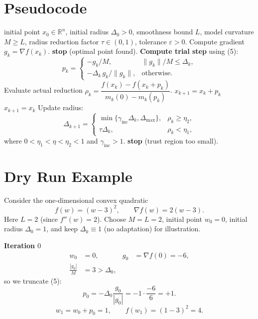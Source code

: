 \documentclass{article}
\begin{document}
\section*{Pseudocode}
\begin{algorithm}[H]
\caption{Trust Region Gradient Descent (TRGD)}
\begin{algorithmic}[1]
\REQUIRE initial point $x_0\in\mathbb{R}^n$, initial radius $\Delta_0>0$, 
smoothness bound $L$, model curvature $M\ge L$, 
radius reduction factor $\tau\in(0,1)$, tolerance $\varepsilon>0$.
    \STATE Compute gradient $g_k=\nabla f(x_k)$.
        \STATE \textbf{stop} (optimal point found).
    \ENDIF
    \STATE \textbf{Compute trial step} using (5):
    \[
    p_k=
    \begin{cases}
        -g_k/M, & \|g_k\|/M\le\Delta_k,\\
        -\Delta_k\,g_k/\|g_k\|, & \text{otherwise.}
    \end{cases}
    \]
    \STATE Evaluate actual reduction $ \rho_k=
    \dfrac{f(x_k)-f(x_k+p_k)}{m_k(0)-m_k(p_k)}$.
        \STATE $x_{k+1}=x_k+p_k$ 
    \ELSE
        \STATE $x_{k+1}=x_k$ 
    \ENDIF
    \STATE Update radius:
    \[
    \Delta_{k+1}=
    \begin{cases}
        \min\{\gamma_{\text{inc}}\Delta_k,\Delta_{\max}\}, & \rho_k\ge \eta_2,\\
        \tau\Delta_k, & \rho_k<\eta_1,
    \end{cases}
    \]
    where $0<\eta_1<\eta<\eta_2<1$ and $\gamma_{\text{inc}}>1$.
        \STATE \textbf{stop} (trust region too small).
    \ENDIF
\ENDFOR
\end{algorithmic}
\end{algorithm}

\section*{Dry Run Example}
Consider the one‑dimensional convex quadratic
\[
f(w)=(w-3)^2,
\qquad \nabla f(w)=2(w-3).
\]
Here $L=2$ (since $f''(w)=2$).  Choose $M=L=2$, initial point $w_0=0$,
initial radius $\Delta_0=1$, and keep $\Delta_k\equiv1$ (no adaptation) for
illustration.

\medskip
\noindent\textbf{Iteration $0$}
\[
\begin{aligned}
w_0 &=0, &
g_0 &=\nabla f(0)= -6,\\
\frac{|g_0|}{M}&=3> \Delta_0,
\end{aligned}
\]
so we truncate (5):
\[
p_0=-\Delta_0\frac{g_0}{|g_0|}= -1\cdot\frac{-6}{6}=+1 .
\]
\[
w_1=w_0+p_0=1,\qquad
f(w_1)=(1-3)^2=4 .
\]
\end{document}
